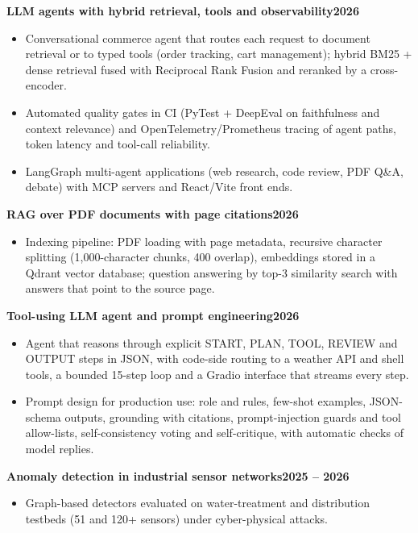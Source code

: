 \documentclass[10pt,a4paper]{article}
\newenvironment{cvitems}{\begin{itemize}[leftmargin=11pt,itemsep=0.5pt,topsep=1pt,parsep=0pt,label={\color{accent}\scriptsize$\blacktriangleright$}]\small}{\end{itemize}\vspace{2pt}}
\newcommand{\cvproject}[3]{%
  \noindent\textbf{#1}\hfill{\small\bfseries\textcolor{accent}{#2}}\par
  \noindent{\footnotesize\textcolor{muted}{#3}}\par}
\begin{document}
\cvproject{LLM agents with hybrid retrieval, tools and observability}{2026}{LangGraph, MCP, BM25 + dense, RRF, cross-encoder, Pydantic, DeepEval, OpenTelemetry, React}
\begin{cvitems}
  \item Conversational commerce agent that routes each request to document retrieval or to typed tools (order tracking, cart management); hybrid BM25 + dense retrieval fused with Reciprocal Rank Fusion and reranked by a cross-encoder.
  \item Automated quality gates in CI (PyTest + DeepEval on faithfulness and context relevance) and OpenTelemetry/Prometheus tracing of agent paths, token latency and tool-call reliability.
  \item LangGraph multi-agent applications (web research, code review, PDF Q\&A, debate) with MCP servers and React/Vite front ends.
\end{cvitems}

\cvproject{RAG over PDF documents with page citations}{2026}{LangChain, Qdrant (Docker), OpenAI text-embedding-3-large, gpt-4o-mini}
\begin{cvitems}
  \item Indexing pipeline: PDF loading with page metadata, recursive character splitting (1,000-character chunks, 400 overlap), embeddings stored in a Qdrant vector database; question answering by top-3 similarity search with answers that point to the source page.
\end{cvitems}

\cvproject{Tool-using LLM agent and prompt engineering}{2026}{OpenAI API (JSON mode), gpt-4o-mini, Gradio, structured outputs, few-shot, self-consistency}
\begin{cvitems}
  \item Agent that reasons through explicit START, PLAN, TOOL, REVIEW and OUTPUT steps in JSON, with code-side routing to a weather API and shell tools, a bounded 15-step loop and a Gradio interface that streams every step.
  \item Prompt design for production use: role and rules, few-shot examples, JSON-schema outputs, grounding with citations, prompt-injection guards and tool allow-lists, self-consistency voting and self-critique, with automatic checks of model replies.
\end{cvitems}

\cvproject{Anomaly detection in industrial sensor networks}{2025 – 2026}{MTGNN, GNN-LSTM, SWaT, WADI}
\begin{cvitems}
  \item Graph-based detectors evaluated on water-treatment and distribution testbeds (51 and 120+ sensors) under cyber-physical attacks.
\end{cvitems}
\end{document}
